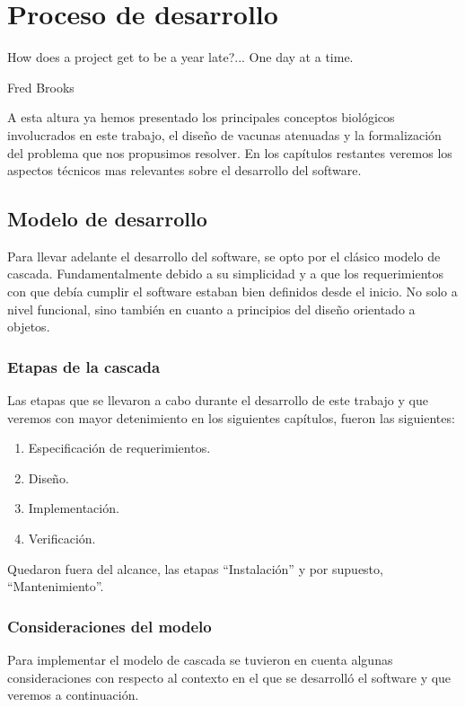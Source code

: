 \chapter{Proceso de desarrollo}
\epigraph{How does a project get to be a year late?... One day at a time.}%
{Fred Brooks}

A esta altura ya hemos presentado los principales conceptos biol\'ogicos
involucrados en este trabajo, el dise\~no de vacunas atenuadas y la
formalizaci\'on del problema que nos propusimos resolver. En los cap\'itulos
restantes veremos los aspectos t\'ecnicos mas relevantes sobre el desarrollo del
software.

\section{Modelo de desarrollo}

Para llevar adelante el desarrollo del software, se opto por el cl\'asico
modelo de cascada. Fundamentalmente debido a su simplicidad y a que los
requerimientos con que deb\'ia cumplir el software estaban bien definidos desde
el inicio. No solo a nivel funcional, sino tambi\'en en cuanto a principios del
dise\~no orientado a objetos.

\subsection{Etapas de la cascada}

Las etapas que se llevaron a cabo durante el desarrollo de este trabajo y que
veremos con mayor detenimiento en los siguientes cap\'itulos, fueron las
siguientes:
\begin{enumerate}
 \item Especificaci\'on de requerimientos.
 \item Dise\~no.
 \item Implementaci\'on.
 \item Verificaci\'on.
\end{enumerate}

Quedaron fuera del alcance, las etapas ``Instalaci\'on'' y por supuesto,
``Mantenimiento''.

\subsection{Consideraciones del modelo}

Para implementar el modelo de cascada se tuvieron en cuenta algunas
consideraciones con respecto al contexto en el que se desarroll\'o el software
y que veremos a continuaci\'on. 

